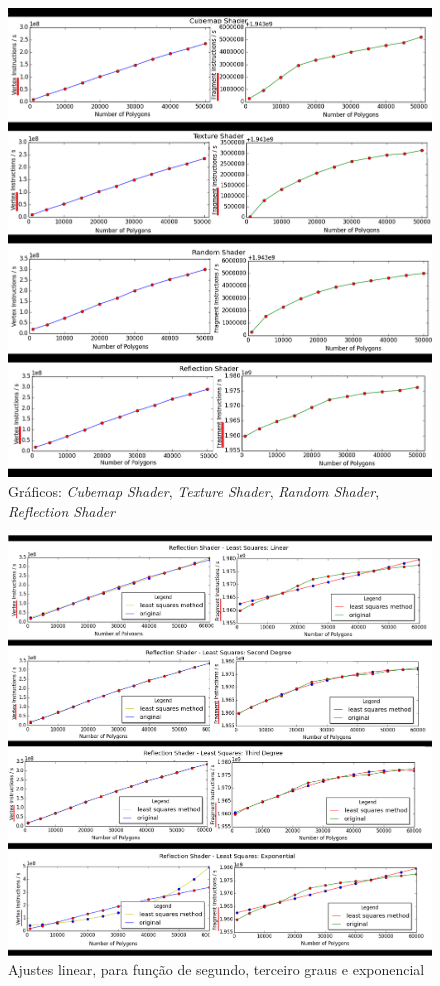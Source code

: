  
	\begin{figure}[ht]
	\centering
		\includegraphics[keepaspectratio=true,scale=0.55]{figuras/cubeplot.png}
	\caption{Gráficos: \textit{Cubemap Shader}, \textit{Texture Shader}, \textit{Random Shader}, \textit{Reflection Shader}}
	\label{plotrefl}
	\end{figure}


	\begin{figure}[ht]
	\centering
		\includegraphics[keepaspectratio=true,scale=0.4]{figuras/reflectionlinear.png}
	\caption{Ajustes linear, para função de segundo, terceiro graus e exponencial}
	\label{linear}
	\end{figure}	
	

